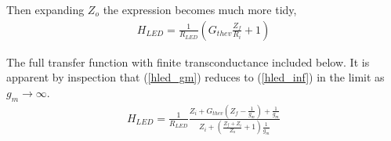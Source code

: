\documentclass{scrartcl}
\begin{document}
	Then expanding $Z_o$ the expression becomes much more tidy,
	\begin{align}
		H_{LED} = \frac{1}{R_{LED}} (G_{thev} \frac{Z_f }{R_i} + 1) \label{hled_inf}
	\end{align} 

	The full transfer function with finite transconductance included below. It is apparent by inspection that (\ref{hled_gm}) reduces to (\ref{hled_inf}) in the limit as $g_m \to \infty$.
	\begin{align}
	H_{LED} = \frac{1}{R_{LED}} \frac{ Z_i + G_{thev}(Z_f - \frac{1}{g_m}) +  \frac{1}{g_m} } {Z_i + ( \frac{Z_f + Z_i}{Z_o} + 1)\frac{1}{g_m}} \label{hled_gm}
\end{align}	
	
\end{document}
